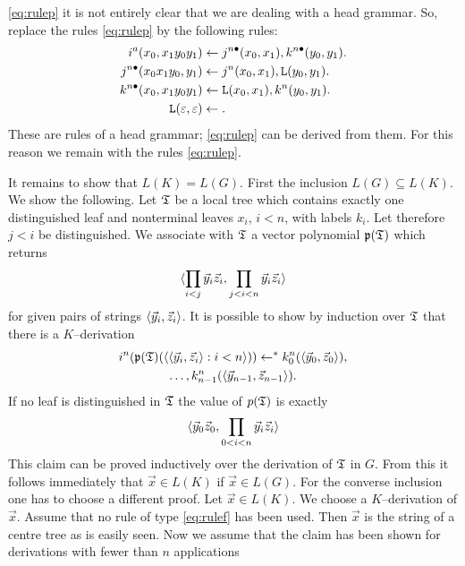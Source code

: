 \eqref{eq:rulep} it is not entirely clear that we are dealing with a
head grammar. So, replace the rules \eqref{eq:rulep} by the following
rules:
\begin{align}
i^a(x_0, x_1y_0y_1) & \leftarrow j^{n\bullet}(x_0,x_1), k^{n\bullet}(y_0,y_1).
\\
j^{n\bullet}(x_0x_1y_0,y_1) & \leftarrow j^n(x_0,x_1), \mbox{\tt L}(y_0,y_1).
\\
k^{n\bullet}(x_0, x_1y_0y_1) & \leftarrow \mbox{\tt L}(x_0, x_1),
    k^n(y_0,y_1). \\
\mbox{\tt L}(\varepsilon, \varepsilon) & \leftarrow .
\end{align}
These are rules of a head grammar; \eqref{eq:rulep} can be derived 
from them. For this reason we remain with the rules \eqref{eq:rulep}.

It remains to show that $L(K) = L(G)$. First the inclusion
$L(G) \subseteq L(K)$. We show the following. Let $\mathfrak{T}$ be a local
tree which contains exactly one distinguished leaf and
nonterminal leaves $x_i$, $i < n$, with labels $k_i$. Let therefore
$j < i$ be distinguished. We associate with $\mathfrak{T}$ a vector
polynomial $\mathfrak{p}(\mathfrak{T})$ which returns
\begin{equation}
\langle \prod_{i < j} \vec{y}_i\vec{z}_i,
\prod_{j < i < n} \vec{y}_i\vec{z}_i\rangle
\end{equation}
for given pairs of strings $\langle \vec{y}_i, \vec{z}_i\rangle$.
It is possible to show by induction over $\mathfrak{T}$ that there is a
$K$--derivation
\begin{multline}
i^n(\mathfrak{p}(\mathfrak{T})(\langle \langle \vec{y}_i, \vec{z}_i\rangle : i < n\rangle))
\leftarrow^{\ast} k_0^n(\langle \vec{y}_0, \vec{z}_0\rangle), \\
\dotsc, 
k_{n-1}^n(\langle \vec{y}_{n-1}, \vec{z}_{n-1}\rangle).
\end{multline}
If no leaf is distinguished in $\mathfrak{T}$ the value of $p(\mathfrak{T})$ is
exactly
\begin{equation}
\langle \vec{y}_0\vec{z}_0,
\prod_{0 < i < n} \vec{y}_i\vec{z}_i\rangle 
\end{equation}
This claim can be proved inductively over the derivation of
$\mathfrak{T}$ in $G$. From this it follows immediately that $\vec{x}
\in L(K)$ if $\vec{x} \in L(G)$. For the converse inclusion one
has to choose a different proof. Let $\vec{x} \in L(K)$.
We choose a $K$--derivation of $\vec{x}$. Assume that no rule of
type \eqref{eq:rulef} has been used. Then $\vec{x}$ is the string of a
centre tree as is easily seen. Now we assume that the claim
has been shown for derivations with fewer than $n$ applications
